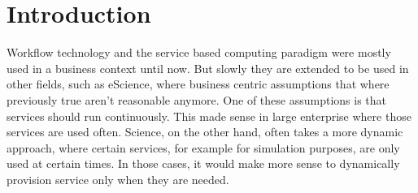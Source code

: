 \chapter{Introduction}

Workflow technology and the service based computing paradigm were mostly used in a business context until now.
But slowly they are extended to be used in other fields, such as eScience, where business centric assumptions that where previously true aren't reasonable anymore.
One of these assumptions is that services should run continuously.
This made sense in large enterprise where those services are used often.
Science, on the other hand, often takes a more dynamic approach, where certain services, for example for simulation purposes, are only used at certain times.
In those cases, it would make more sense to dynamically provision service only when they are needed.



